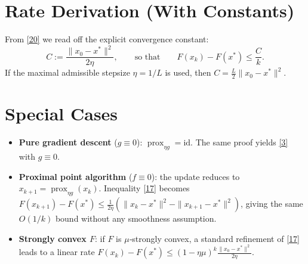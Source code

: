 \documentclass{article}
\newcommand{\prox}{\operatorname{prox}}
\begin{document}
\section*{Rate Derivation (With Constants)}
From \eqref{20} we read off the explicit convergence constant:
\[
C:=\frac{\|x_{0}-x^{*}\|^{2}}{2\eta},
\qquad\text{so that}\qquad
F(x_{k})-F(x^{*})\le \frac{C}{k}.
\]
If the maximal admissible stepsize $\eta=1/L$ is used, then $C=\frac{L}{2}\|x_{0}-x^{*}\|^{2}$.

\section*{Special Cases}
\begin{itemize}
\item \textbf{Pure gradient descent} ($g\equiv0$): $\prox_{\eta g}= \text{id}$. The same proof yields \eqref{3} with $g\equiv0$.
\item \textbf{Proximal point algorithm} ($f\equiv0$): the update reduces to $x_{k+1}= \prox_{\eta g}(x_{k})$. Inequality \eqref{17} becomes $F(x_{k+1})-F(x^{*})\le\frac{1}{2\eta}(\|x_{k}-x^{*}\|^{2}-\|x_{k+1}-x^{*}\|^{2})$, giving the same $O(1/k)$ bound without any smoothness assumption.
\item \textbf{Strongly convex $F$}: if $F$ is $\mu$‑strongly convex, a standard refinement of \eqref{17} leads to a linear rate $F(x_{k})-F(x^{*})\le (1-\eta\mu)^{k}\frac{\|x_{0}-x^{*}\|^{2}}{2\eta}$.
\end{itemize}
\end{document}
